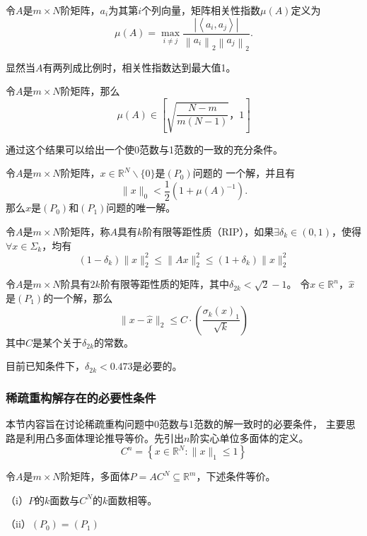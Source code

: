 \begin{definition}
    令$A$是$m\times N$阶矩阵，$a_i$为其第$i$个列向量，矩阵相关性指数$\mu (A)$定义为
    \begin{equation}
        \mu(A)=\max _{i \neq j} \frac{\left|\left\langle a_i,a_j\right\rangle\right|}{\left\|a_i\right\|_2\left\|a_j\right\|_2} .
    \end{equation}
\end{definition}
显然当$A$有两列成比例时，相关性指数达到最大值1。
\begin{lemma}
    令$A$是$m\times N$阶矩阵，那么
    \begin{equation}
        \mu(A) \in\left[\sqrt{\frac{N-m}{m(N-1)}}，1\right]
    \end{equation}
\end{lemma}
通过这个结果可以给出一个使0范数与1范数的一致的充分条件。
\begin{theorem}
    令$A$是$m\times N$阶矩阵，$x \in \mathbb{R}^N \backslash\{0\}$是$(P_0)$问题的
    一个解，并且有
    \begin{equation}
        \|x\|_0<\frac{1}{2}\left(1+\mu(A)^{-1}\right) .
    \end{equation}
    那么$x$是$(P_0)$和$(P_1)$问题的唯一解。
\end{theorem}

\begin{definition}
    令$A$是$m\times N$阶矩阵，称$A$具有$k$阶有限等距性质（RIP），如果$\exists \delta_k
    \in (0,1)$，使得$\forall x \in \Sigma_k$，均有
    \begin{equation}
        \left(1-\delta_k\right)\|x\|_2^2 \leq\|A x\|_2^2 \leq\left(1+\delta_k\right)\|x\|_2^2
    \end{equation}
\end{definition}
\begin{theorem}
    令$A$是$m\times N$阶具有$2k$阶有限等距性质的矩阵，其中$\delta_{2 k}<\sqrt{2} -1$。
    令$x \in \mathbb{R}^n$，$\hat{x}$是$(P_1)$的一个解，那么
    \begin{equation}
        \|x-\hat{x}\|_2 \leq C \cdot\left(\frac{\sigma_k(x)_1}{\sqrt{k}}\right)
    \end{equation}
    其中$C$是某个关于$\delta_{2 k}$的常数。
\end{theorem}
目前已知条件下，$\delta_{2 k}<0.473$是必要的。
\subsubsection{稀疏重构解存在的必要性条件}
本节内容旨在讨论稀疏重构问题中0范数与1范数的解一致时的必要条件，
主要思路是利用凸多面体理论推导等价。先引出$n$阶实心单位多面体的定义。
\begin{equation}
    C^n=\left\{x \in \mathbb{R}^N:\|x\|_1 \leq 1\right\}
\end{equation}
\begin{theorem}
    令$A$是$m\times N$阶矩阵，多面体$P=A C^N \subseteq \mathbb{R}^m$，下述条件等价。\par
    （i）$P$的$k$面数与$C^N$的$k$面数相等。\par
    （ii）$(P_0)=(P_1)$
\end{theorem}
